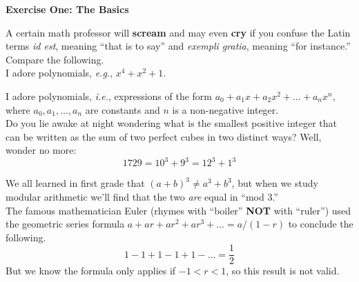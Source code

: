 \documentclass{amsart}
\begin{document}
\begin{center}
\textbf{Exercise One: The Basics}
\end{center}
  
A certain math professor will \textbf{scream} and may even \textbf{cry} if you confuse 
the Latin terms \emph{id est}, meaning ``that is to say'' and \emph{exempli
gratia}, meaning ``for instance.'' Compare the following.\\

I adore polynomials, \emph{e.g.}, $x^4+x^2+1$.

I adore polynomials, \emph{i.e.}, expressions of the form
$a_0+a_1x+a_2x^2+\dots+a_nx^n$, where $a_0, a_1, ..., a_n$ are constants and $n$ is a
non-negative integer.\\

Do you lie awake at night wondering what is the smallest positive integer that can be
written as the sum of two perfect cubes in two distinct ways? Well, wonder no more:
$$1729=10^3+9^3=12^3+1^3$$

We all learned in first grade that $(a+b)^3\neq a^3+b^3$, but when we study modular
arithmetic we'll find that the two \textit{are} equal in ``mod 3.''\\

The famous mathematician Euler (rhymes with ``boiler'' \textbf{NOT} with ``ruler'') used
the geometric series formula $a+ar+ar^2+ar^3+...=a/(1-r)$ to
conclude the following.
$$1-1+1-1+1-\dots = \frac{1}{2}$$
But we know the formula only applies if $-1<r<1$, so this result is not valid.
\end{document}
